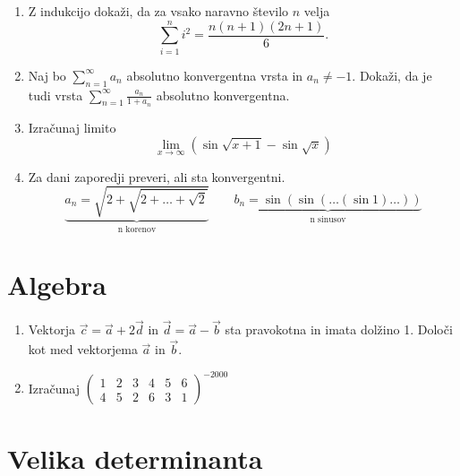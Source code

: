 \documentclass[a4paper,12pt]{article}
\begin{document}
\begin{enumerate}
\item
Z indukcijo dokaži, da za vsako naravno število \(n\) velja
\[\sum_{i=1}^{n}i^2=\frac{n(n+1)(2n+1)}{6}.\]

\item
Naj bo \(\sum_{n=1}^{\infty}a_n\) absolutno konvergentna vrsta in \(a_n \ne -1\).
Dokaži, da je tudi vrsta \(\sum_{n=1}^\infty \frac{a_n}{1+a_n}\)
absolutno konvergentna.

\item
Izračunaj limito
\[\lim_{x\rightarrow\infty}(\sin\sqrt{x+1}-\sin\sqrt{x})\]

\item
Za dani zaporedji preveri, ali sta konvergentni.
\[\underbrace{a_n = \sqrt{2+\sqrt{2+\dots+\sqrt{2}}}}_{\text{n~korenov}}\qquad  \underbrace{b_n = \sin(\sin(\dots(\sin 1)\dots))}_{\text{n~sinusov}}\]
\end{enumerate}

\section*{Algebra}

\begin{enumerate}
\item
Vektorja \(\vec{c} = \vec{a}+2\vec{d}\) in \(\vec{d}=\vec{a}-\vec{b}\)
sta pravokotna in imata dolžino 1. Določi kot med vektorjema \(\vec{a}\) in \(\vec{b}\).

\item
Izračunaj \(\left(
\begin{array}{cccccc}
1 & 2 & 3 & 4 & 5 & 6 \\
4 & 5 & 2 & 6 & 3 & 1
\end{array}
\right)^{-2000}\)
\end{enumerate}

\section*{Velika determinanta}
\end{document}
